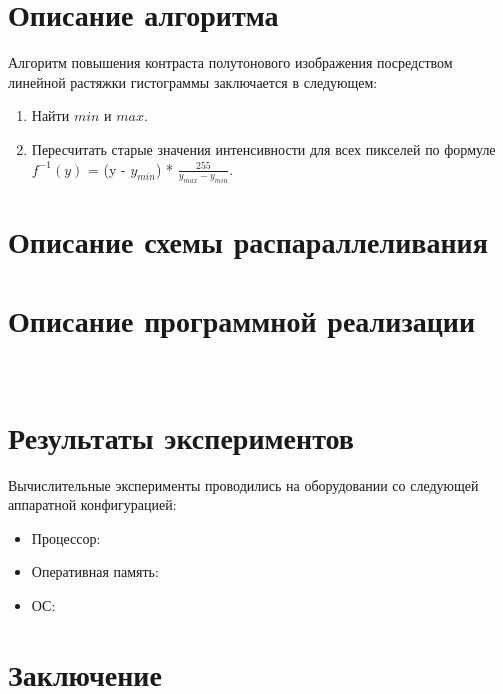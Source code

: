 \documentclass{report}
\begin{document}
\section*{Описание алгоритма}
Алгоритм повышения контраста полутонового изображения посредством линейной растяжки гистограммы заключается в следующем:
\begin{enumerate}
\item Найти $min$ и $max$.
\item Пересчитать старые значения интенсивности для всех пикселей по формуле $f^{-1}(y)$ = (y - $y_{min}$) * ${\frac{255}{y_{max} - y_{min}}}$.
\end{enumerate}
\newpage

\section*{Описание схемы распараллеливания}

\newpage

\section*{Описание программной реализации}
\

\newpage

\section*{Результаты экспериментов}
Вычислительные эксперименты проводились на оборудовании со следующей аппаратной конфигурацией:
\begin{itemize}
\item Процессор: 
\item Оперативная память: 
\item ОС: 
\end{itemize}

\newpage

\section*{Заключение}

\newpage
\end{document}
